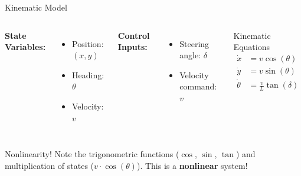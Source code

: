 \documentclass[10pt]{beamer}
\begin{document}
\begin{frame}{Kinematic Model}
  \begin{columns}[c]
    \textbf{State Variables:}
    \begin{itemize}
      \item Position: $(x, y)$
      \item Heading: $\theta$
      \item Velocity: $v$
    \end{itemize}

    \vspace{0.3cm}

    \textbf{Control Inputs:}
    \begin{itemize}
      \item Steering angle: $\delta$
      \item Velocity command: $v$
    \end{itemize}

    \begin{block}{Kinematic Equations}
      \begin{align*}
        \dot{x} &= v \cos(\theta) \\
        \dot{y} &= v \sin(\theta) \\
        \dot{\theta} &= \frac{v}{L} \tan(\delta)
      \end{align*}
    \end{block}
  \end{columns}

  \vspace{0.5cm}

  \begin{alertblock}{Nonlinearity!}
    Note the trigonometric functions ($\cos$, $\sin$, $\tan$) and multiplication of states ($v \cdot \cos(\theta)$). This is a \textbf{nonlinear} system!
  \end{alertblock}
\end{frame}
\end{document}
